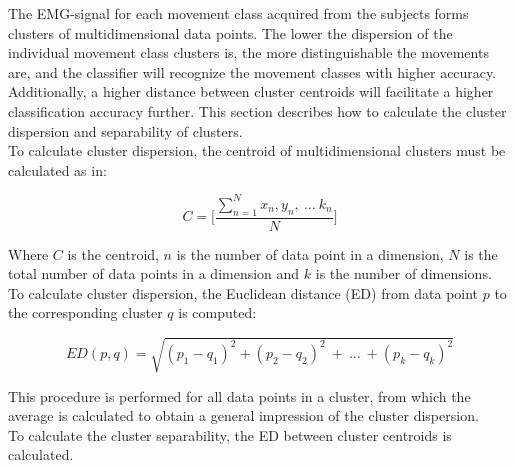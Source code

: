 The EMG-signal for each movement class acquired from the subjects forms clusters of multidimensional data points. The lower the dispersion of the individual movement class clusters is, the more distinguishable the movements are, and the classifier will recognize the movement classes with higher accuracy. Additionally, a higher distance between cluster centroids will facilitate a higher classification accuracy further. This section describes how to calculate the cluster dispersion and separability of clusters. \\
To calculate cluster dispersion, the centroid of multidimensional clusters must be calculated as in:

 \begin{equation} \label{eq:centroid}
C = \Bigg[ \frac{\sum\limits_{n=1}^{N}x_{n},y_{n},~...~k_{n}}{N} \Bigg]
\end{equation}

Where $C$ is the centroid, $n$ is the number of data point in a dimension, $N$ is the total number of data points in a dimension and $k$ is the number of dimensions. To calculate cluster dispersion, the Euclidean distance (ED) from data point $p$ to the corresponding cluster $q$ is computed: %

\begin{equation} \label{eq:euclidiandistance}
ED(p,q) = \sqrt{(p_1-q_1)^2 + (p_2-q_2)^2~+~...~+ (p_k-q_k)^2}
\end{equation} 

This procedure is performed for all data points in a cluster, from which the average is calculated to obtain a general impression of the cluster dispersion.\\
To calculate the cluster separability, the ED between cluster centroids is calculated.  

